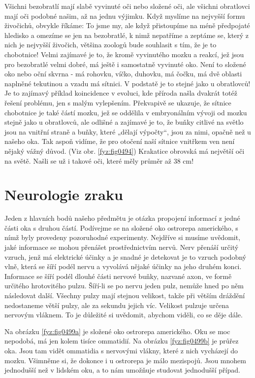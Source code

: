     Všichni bezobratlí mají slabě vyvinuté oči nebo složené oči, ale všichni obratlovci mají oči
    podobné našim, až na jednu výjimku. Když myslíme na nejvyšší formu živočichů, obvykle říkáme: To
    jsme my, ale když přistoupíme na méně předpojaté hledisko a omezíme se jen na bezobratlé, k nimž
    nepatříme a zeptáme se, který z nich je nejvyšší živočich, většina zoologů bude souhlasit s tím,
    že je to chobotnice! Velmi zajímavé je to, že kromě vyvinutého mozku a reakcí, jež jsou pro
    bezobratlé velmi dobré, má ještě i samostatně vyvinuté oko. Není to složené oko nebo oční skvrna
    - má rohovku, víčko, duhovku, má čočku, má dvě oblasti naplněné tekutinou a vzadu má sítnici. V
    podstatě je to stejné jako u obratlovců! Je to zajímavý příklad koincidence v evoluci, kde
    příroda našla dvakrát totéž řešení problému, jen s malým vylepšením. Překvapivě se ukazuje, že
    sítnice chobotnice je také částí mozku, jež se oddělila v embryonálním vývoji od mozku stejně
    jako u obratlovců, ale odlišné a zajímavé je to, že buňky citlivé na světlo jsou na vnitřní
    straně a buňky, které „dělají výpočty“, jsou za nimi, opačně než u našeho oka. Tak aspoň vidíme,
    že pro otočení naší sítnice vnitřkem ven není nějaký vážný důvod. (Viz obr. \ref{fyz:fig0494})
    Krakatice obrovská má největší oči na světě. Našli se už i takové oči, které měly průměr až 38
    cm!
  
  \section{Neurologie zraku}\label{fyz:IchapXXXVIsecVI}
    Jeden z hlavních bodů našeho předmětu je otázka propojení informací z jedné části oka s druhou
    částí. Podívejme se na složené oko ostrorepa amerického, s nímž byly provedeny pozoruhodné
    experimenty. Nejdříve si musíme uvědomit, jaké informace se mohou přenášet prostřednictvím
    nervů. Nerv přenáší určitý vzruch, jenž má elektrické účinky a je snadné je detekovat je to
    vzruch podobný vlně, která se šíří podél nervu a vyvolává nějaké účinky na jeho druhém konci.
    Informace se šíří podél dlouhé části nervové buňky, nazvané axon, ve formě určitého hrotovitého
    pulzu. Šíří-li se po nervu jeden pulz, nemůže hned po něm následovat další. Všechny pulzy mají
    stejnou velikost, takže při větším dráždění nedostaneme větší pulzy, ale za sekundu jejich víc.
    Velikost pulzuje určena nervovým vláknem. To je důležité si uvědomit, abychom viděli, co se děje
    dále. 
    
    Na obrázku \ref {fyz:fig0499a} je složené oko ostrorepa amerického. Oku se moc nepodobá, má jen
    kolem tisíce ommatidií. Na obrázku \ref {fyz:fig0499b}  je průřez oka. Jsou tam vidět ommatidia s
    nervovými vlákny, které z nich vycházejí do mozku. Všimněme si, že dokonce i u ostrorepa je málo
    mezispojů. Jsou mnohem jednodušší než v lidském oku, a to nám umožňuje studovat jednodušší
    případ.

